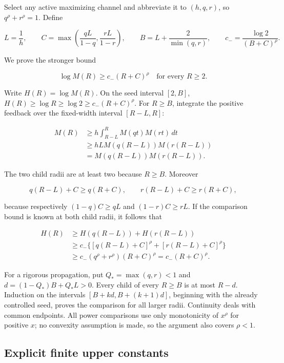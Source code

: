 Select any active maximizing channel and abbreviate it to \((h,q,r)\),
so \(q^\rho+r^\rho=1\). Define

\[
L=\frac1h,\qquad
C=\max\left(\frac{qL}{1-q},\frac{rL}{1-r}\right),\qquad
B=L+\frac2{\min(q,r)},\qquad
c_-=\frac{\log2}{(B+C)^\rho}.
\]

We prove the stronger bound

\[
\boxed{\log M(R)\ge c_-(R+C)^\rho\quad\text{for every }R\ge2.}
\]

Write \(H(R)=\log M(R)\). On the seed interval \([2,B]\),
\(H(R)\ge\log R\ge\log2\ge c_-(R+C)^\rho\). For \(R\ge B\), integrate
the positive feedback over the fixed-width interval \([R-L,R]\):

\[
\begin{aligned}
M(R)&\ge h\int_{R-L}^{R}M(qt)M(rt)\,dt\\
&\ge hL M(q(R-L))M(r(R-L))\\
&=M(q(R-L))M(r(R-L)).
\end{aligned}
\]

The two child radii are at least two because \(R\ge B\). Moreover

\[
q(R-L)+C\ge q(R+C),\qquad
r(R-L)+C\ge r(R+C),
\]

because respectively \((1-q)C\ge qL\) and \((1-r)C\ge rL\). If the
comparison bound is known at both child radii, it follows that

\[
\begin{aligned}
H(R)&\ge H(q(R-L))+H(r(R-L))\\
&\ge c_-\{[q(R-L)+C]^\rho+[r(R-L)+C]^\rho\}\\
&\ge c_-(q^\rho+r^\rho)(R+C)^\rho
=c_-(R+C)^\rho.
\end{aligned}
\]

For a rigorous propagation, put \(Q_* =\max(q,r)<1\) and
\(d=(1-Q_*)B+Q_*L>0\). Every child of every \(R\ge B\) is at most
\(R-d\). Induction on the intervals \([B+kd,B+(k+1)d]\), beginning with
the already controlled seed, proves the comparison for all larger radii.
Continuity deals with common endpoints. All power comparisons use only
monotonicity of \(x^\rho\) for positive \(x\); no convexity assumption
is made, so the argument also covers \(\rho<1\).

\hypertarget{explicit-finite-upper-constants}{%
\subsection{Explicit finite upper
constants}\label{explicit-finite-upper-constants}}

